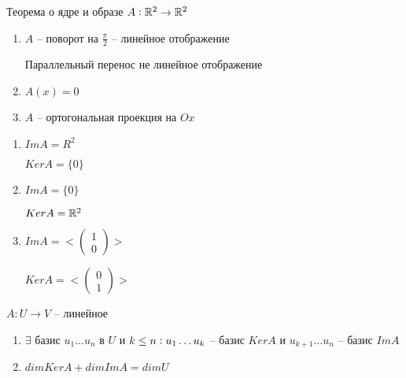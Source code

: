 \documentclass[12pt]{article}
\begin{document}
\begin{theo}{Теорема о ядре и образе}
    $A : \mathbb R^2 \rightarrow \mathbb R^2$

    \begin{Example}{}
        \begin{enumerate}
            \item $A$ -- поворот на $\frac{\pi}{2}$ -- линейное отображение
            
            \begin{Remark}{}
                Параллельный перенос не линейное отображение
            \end{Remark}
    
            \item $A(x) = 0$
            
            \item $A$ -- ортогональная проекция на $Ox$
        \end{enumerate}
    \end{Example}

    \begin{enumerate}
        \item $ImA = R^2$
        
        $KerA = \{0\}$

        \item $ImA = \{0\}$
        
        $KerA = \mathbb R^2$

        \item $ImA = < \begin{pmatrix}
            1 \\
            0
        \end{pmatrix} >$

        $KerA = < \begin{pmatrix}
            0 \\
            1
        \end{pmatrix} >$
    \end{enumerate}
\end{theo}

\begin{theo}{}
    $A : U \rightarrow V$ -- линейное

    \begin{enumerate}
        \item $\exists$ базис $u_1 \ldots u_n$ в $U$ и $k \leq n : \\ u_1 \ldots u_k$ -- базис $KerA$ и $u_{k + 1} \ldots u_n$ -- базис $ImA$
        \item $dimKerA + dimImA = dimU$
    \end{enumerate}
\end{theo}
\end{document}
